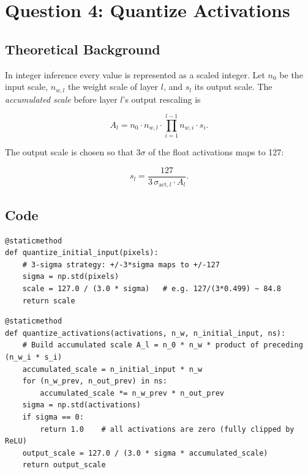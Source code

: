 \documentclass[11pt, letterpaper]{article}
\begin{document}
\section{Question 4: Quantize Activations}

\subsection{Theoretical Background}

In integer inference every value is represented as a scaled integer.
Let $n_0$ be the input scale, $n_{w,l}$ the weight scale of layer $l$,
and $s_l$ its output scale. The \emph{accumulated scale} before layer $l$'s
output rescaling is

\begin{equation}
  A_l = n_0 \cdot n_{w,l} \cdot \prod_{i=1}^{l-1} n_{w,i}\cdot s_i.
  \label{eq:acc_scale}
\end{equation}

The output scale is chosen so that $3\sigma$ of the float activations maps to 127:

\begin{equation}
  s_l = \frac{127}{3\,\sigma_{\mathrm{act},l} \cdot A_l}.
  \label{eq:output_scale}
\end{equation}

\subsection{Code}

\begin{lstlisting}[caption={Scale for the initial input --- \texttt{quantize\_initial\_input}.}]
@staticmethod
def quantize_initial_input(pixels):
    # 3-sigma strategy: +/-3*sigma maps to +/-127
    sigma = np.std(pixels)
    scale = 127.0 / (3.0 * sigma)   # e.g. 127/(3*0.499) ~ 84.8
    return scale
\end{lstlisting}

\begin{lstlisting}[caption={Per-layer output scale --- \texttt{quantize\_activations}.}]
@staticmethod
def quantize_activations(activations, n_w, n_initial_input, ns):
    # Build accumulated scale A_l = n_0 * n_w * product of preceding (n_w_i * s_i)
    accumulated_scale = n_initial_input * n_w
    for (n_w_prev, n_out_prev) in ns:
        accumulated_scale *= n_w_prev * n_out_prev
    sigma = np.std(activations)
    if sigma == 0:
        return 1.0    # all activations are zero (fully clipped by ReLU)
    output_scale = 127.0 / (3.0 * sigma * accumulated_scale)
    return output_scale
\end{lstlisting}
\end{document}
